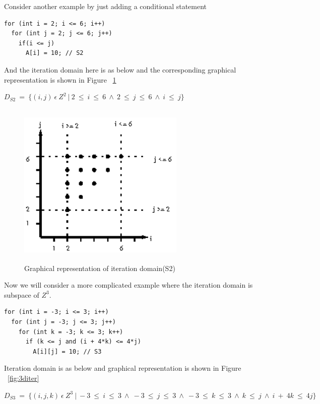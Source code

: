 \noindent
Consider another example by just adding a conditional statement
{\footnotesize
\begin{lstlisting}
for (int i = 2; i <= 6; i++)
  for (int j = 2; j <= 6; j++)
    if(i <= j)
      A[i] = 10; // S2
\end{lstlisting}
}
\noindent
And the iteration domain here is as below and the corresponding graphical representation is shown in Figure ~\ref{fig:iter1}

\begin{center}
$D_{S2}\ =\ \{(i,j)\ \epsilon\ Z^2\ |\ 2\ \leq\ i\ \leq\ 6\ \wedge\ 2\ \leq\ j\ \leq\ 6\ \wedge\ i\ \leq\ j\}$
\end{center}
\begin{figure}
\begin{center}
  \includegraphics[height=8cm,width=8cm]{images/iter1.eps}
  \caption{Graphical representation of iteration domain(S2)}
  \label{fig:iter1}
\end{center}  
\end{figure}

\noindent
Now we will consider a more complicated example where the iteration domain is subspace of $Z^3$.
{\footnotesize
\begin{lstlisting}
for (int i = -3; i <= 3; i++)
  for (int j = -3; j <= 3; j++)
    for (int k = -3; k <= 3; k++)
      if (k <= j and (i + 4*k) <= 4*j)
        A[i][j] = 10; // S3
\end{lstlisting}
}

\noindent
Iteration domain is as below and graphical representation is shown in Figure ~\ref{fig:3diter}

\begin{center}
$D_{S3}\ =\ \{(i,j,k)\ \epsilon\ Z^3\ |\ -3\ \leq\ i\ \leq\ 3\ \wedge\ -3\ \leq\ j\ \leq\ 3\ \wedge\ -3\ \leq\ k\ \leq\ 3\ \wedge\ k\ \leq\ j\ \wedge\ i\ +\ 4k\ \leq\ 4j\}$
\end{center}

